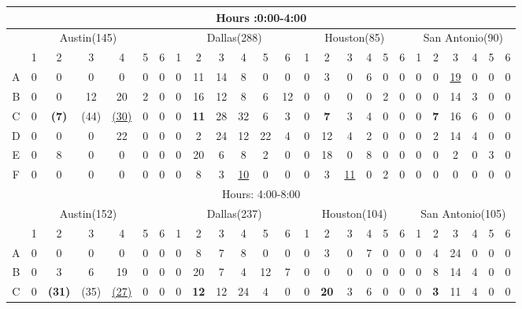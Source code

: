 \begin{table*}	
\centering	
\begin{tabular}{|c|c|c|c|c|c|c|c|c|c|c|c|c|c|c|c|c|c|c|c|c|c|c|c|c|}	
\hline	
\multicolumn{25}{|c|}{Hours :0:00-4:00} 	\\
\hline	
\multicolumn{7}{|c|}{Austin(145)} 	&
\multicolumn{6}{c|}{Dallas(288)} 	&
\multicolumn{6}{c|}{Houston(85)} 	&
\multicolumn{6}{c|}{San Antonio(90)} 	\\
\hline	
\hline	
 & 1 &2 & 3 & 4 & 5&6 	
 & 1 &2 & 3 & 4 & 5&6 	
 & 1 &2 & 3 & 4 & 5&6 	
 & 1 &2 & 3 & 4 & 5&6 \\	
\hline
A	
& 0& 0& 0& 0& 0& 0  &	
 0& 11& 14& 8& 0& 0 &
 0& 3& 0& 6& 0& 0  &	
 0& 0& \underline{19}& 0& 0& 0  \\
\hline	
B	
& 0& 0& 12& 20& 2& 0 &
 0& 16& 12& 8& 6& 12 
& 0& 0& 0& 0& 2& 0  
& 0& 0& 14& 3& 0& 0\\
\hline	
C	
& 0& \textbf{(7)}& (44)& \underline{(30)}& 0& 0  
& 0& \textbf{11}& 28& 32& 6& 3
& 0& \textbf{7}& 3& 4& 0& 0  
& 0& \textbf{7}& 16& 6& 0& 0  \\		
\hline
D 	
& 0& 0& 0& 22& 0& 0  
& 0& 2& 24& 12& 22& 4 
& 0& 12& 4& 2& 0& 0
& 0& 2& 14& 4& 0& 0  \\	
\hline
E 	
& 0& 8& 0& 0& 0& 0  
& 0& 20& 6& 8& 2& 0
& 0& 18& 0& 8& 0& 0
& 0& 0& 2& 0& 3& 0 \\
\hline
F 	
& 0& 0& 0& 0& 0& 0  
& 0& 8& 3& \underline{10}& 0& 0 
& 0& 3& \underline{11}& 0& 2& 0
& 0& 0& 0& 0& 0& 0  \\		
\hline	
\hline	
\multicolumn{25}{|c|}{Hours: 4:00-8:00} 	\\
\hline	
\multicolumn{7}{|c|}{Austin(152)} 	&
\multicolumn{6}{c|}{Dallas(237)} 	&
\multicolumn{6}{c|}{Houston(104)} 	&
\multicolumn{6}{c|}{San Antonio(105)} 	\\
\hline	
\hline	
 & 1 &2 & 3 & 4 & 5&6 	
 & 1 &2 & 3 & 4 & 5&6 	
 & 1 &2 & 3 & 4 & 5&6 	
 & 1 &2 & 3 & 4 & 5&6 \\	
\hline
A	
& 0& 0& 0& 0& 0& 0
& 0& 8& 7& 8& 0& 0 
& 0& 3& 0& 7& 0& 0 
& 0& 4& 24& 0& 0& 0 \\
\hline
B
& 0& 3& 6& 19& 0& 0
& 0& 20& 7& 4& 12& 7
& 0& 0& 0& 0& 0& 0
& 0& 8& 14& 4& 0& 0\\
\hline
C
& 0& \textbf{(31)}& (35)& \underline{(27)}& 0& 0
& 0& \textbf{12}& 12& 24& 4& 0
& 0& \textbf{20}& 3 & 6& 0& 0  
& 0& \textbf{3}& 11& 4& 0& 0\\

\end{tabular}
\end{table*}
